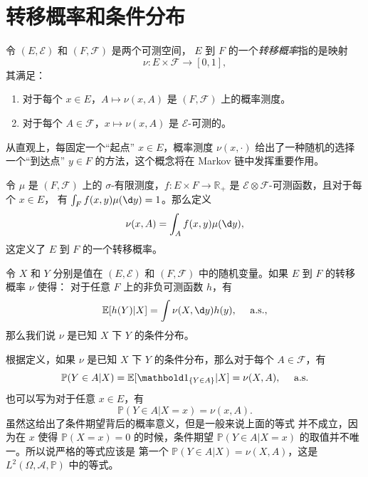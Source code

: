 \section{转移概率和条件分布}

\begin{definition}
  令 $(E,\mathcal{E})$ 和 $(F,\mathcal{F})$ 是两个可测空间，
  $E$ 到 $F$ 的一个\emph{转移概率}指的是映射
  \[
    \nu:E\times \mathcal{F}\to [0,1],  
  \]
  其满足：
  \begin{enumerate}
    \item 对于每个 $x\in E$，$A\mapsto \nu(x,A)$ 是
    $(F,\mathcal{F})$ 上的概率测度。
    \item 对于每个 $A\in \mathcal{F}$，$x\mapsto \nu(x,A)$
    是 $\mathcal{E}$-可测的。
  \end{enumerate}
\end{definition}

从直观上，每固定一个“起点” $x\in E$，概率测度 $\nu(x,\cdot)$
给出了一种随机的选择一个“到达点” $y\in F$ 的方法，这个概念将在
Markov 链中发挥重要作用。

\begin{example}
  令 $\mu$ 是 $(F,\mathcal{F})$ 上的 $\sigma$-有限测度，$f:E\times F\to \mathbb{R}_+$
  是 $\mathcal{E}\otimes \mathcal{F}$-可测函数，且对于每个 $x\in E$，
  有 $\int_F f(x,y)\mu(\d y)=1$。那么定义
  \[
    \nu(x,A)=\int_A f(x,y)\mu(\d y),
  \]
  这定义了 $E$ 到 $F$ 的一个转移概率。
\end{example}


\begin{definition}
  令 $X$ 和 $Y$ 分别是值在 $(E,\mathcal{E})$ 和 $(F,\mathcal{F})$
  中的随机变量。如果 $E$ 到 $F$ 的转移概率 $\nu$ 使得：
  对于任意 $F$ 上的非负可测函数 $h$，有
  \[
    \mathbb{E}[h(Y)|X]=\int\nu(X,\d y) h(y),\quad 
    \alsu{},  
  \]
  那么我们说 $\nu$ 是已知 $X$ 下 $Y$ 的条件分布。
\end{definition}

根据定义，如果 $\nu$ 是已知 $X$ 下 $Y$ 的条件分布，那么对于每个
$A\in \mathcal{F}$，有
\[
  \mathbb{P}(Y\in A|X)=\mathbb{E}[\indicator{\{Y\in A\}}|X]
  =\nu(X,A),\quad \alsu{}
\]
也可以写为对于任意 $x\in E$，有
\[
  \mathbb{P}(Y\in A| X=x)=\nu(x,A).  
\]
虽然这给出了条件期望背后的概率意义，但是一般来说上面的等式
并不成立，因为在 $x$ 使得 $\mathbb{P}(X=x)=0$ 的时候，条件期望
$\mathbb{P}(Y\in A|X=x)$ 的取值并不唯一。所以说严格的等式应该是
第一个 $\mathbb{P}(Y\in A|X)=\nu (X,A)$，这是 $L^2(\Omega,\mathcal{A},\mathbb{P})$
中的等式。









